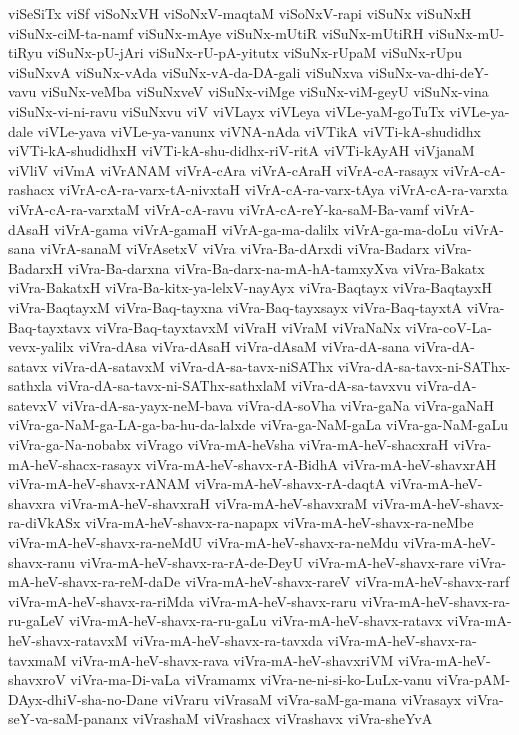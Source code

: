 {viSeSiTx
viSf
viSoNxVH
viSoNxV-maqtaM
viSoNxV-rapi
viSuNx
viSuNxH
viSuNx-ciM-ta-namf
viSuNx-mAye
viSuNx-mUtiR
viSuNx-mUtiRH
viSuNx-mU-tiRyu
viSuNx-pU-jAri
viSuNx-rU-pA-yitutx
viSuNx-rUpaM
viSuNx-rUpu
viSuNxvA
viSuNx-vAda
viSuNx-vA-da-DA-gali
viSuNxva
viSuNx-va-dhi-deY-vavu
viSuNx-veMba
viSuNxveV
viSuNx-viMge
viSuNx-viM-geyU
viSuNx-vina
viSuNx-vi-ni-ravu
viSuNxvu
viV
viVLayx
viVLeya
viVLe-yaM-goTuTx
viVLe-ya-dale
viVLe-yava
viVLe-ya-vanunx
viVNA-nAda
viVTikA
viVTi-kA-shudidhx
viVTi-kA-shudidhxH
viVTi-kA-shu-didhx-riV-ritA
viVTi-kAyAH
viVjanaM
viVliV
viVmA
viVrANAM
viVrA-cAra
viVrA-cAraH
viVrA-cA-rasayx
viVrA-cA-rashacx
viVrA-cA-ra-varx-tA-nivxtaH
viVrA-cA-ra-varx-tAya
viVrA-cA-ra-varxta
viVrA-cA-ra-varxtaM
viVrA-cA-ravu
viVrA-cA-reY-ka-saM-Ba-vamf
viVrA-dAsaH
viVrA-gama
viVrA-gamaH
viVrA-ga-ma-dalilx
viVrA-ga-ma-doLu
viVrA-sana
viVrA-sanaM
viVrAsetxV
viVra
viVra-Ba-dArxdi
viVra-Badarx
viVra-BadarxH
viVra-Ba-darxna
viVra-Ba-darx-na-mA-hA-tamxyXva
viVra-Bakatx
viVra-BakatxH
viVra-Ba-kitx-ya-lelxV-nayAyx
viVra-Baqtayx
viVra-BaqtayxH
viVra-BaqtayxM
viVra-Baq-tayxna
viVra-Baq-tayxsayx
viVra-Baq-tayxtA
viVra-Baq-tayxtavx
viVra-Baq-tayxtavxM
viVraH
viVraM
viVraNaNx
viVra-coV-La-vevx-yalilx
viVra-dAsa
viVra-dAsaH
viVra-dAsaM
viVra-dA-sana
viVra-dA-satavx
viVra-dA-satavxM
viVra-dA-sa-tavx-niSAThx
viVra-dA-sa-tavx-ni-SAThx-sathxla
viVra-dA-sa-tavx-ni-SAThx-sathxlaM
viVra-dA-sa-tavxvu
viVra-dA-satevxV
viVra-dA-sa-yayx-neM-bava
viVra-dA-soVha
viVra-gaNa
viVra-gaNaH
viVra-ga-NaM-ga-LA-ga-ba-hu-da-lalxde
viVra-ga-NaM-gaLa
viVra-ga-NaM-gaLu
viVra-ga-Na-nobabx
viVrago
viVra-mA-heVsha
viVra-mA-heV-shacxraH
viVra-mA-heV-shacx-rasayx
viVra-mA-heV-shavx-rA-BidhA
viVra-mA-heV-shavxrAH
viVra-mA-heV-shavx-rANAM
viVra-mA-heV-shavx-rA-daqtA
viVra-mA-heV-shavxra
viVra-mA-heV-shavxraH
viVra-mA-heV-shavxraM
viVra-mA-heV-shavx-ra-diVkASx
viVra-mA-heV-shavx-ra-napapx
viVra-mA-heV-shavx-ra-neMbe
viVra-mA-heV-shavx-ra-neMdU
viVra-mA-heV-shavx-ra-neMdu
viVra-mA-heV-shavx-ranu
viVra-mA-heV-shavx-ra-rA-de-DeyU
viVra-mA-heV-shavx-rare
viVra-mA-heV-shavx-ra-reM-daDe
viVra-mA-heV-shavx-rareV
viVra-mA-heV-shavx-rarf
viVra-mA-heV-shavx-ra-riMda
viVra-mA-heV-shavx-raru
viVra-mA-heV-shavx-ra-ru-gaLeV
viVra-mA-heV-shavx-ra-ru-gaLu
viVra-mA-heV-shavx-ratavx
viVra-mA-heV-shavx-ratavxM
viVra-mA-heV-shavx-ra-tavxda
viVra-mA-heV-shavx-ra-tavxmaM
viVra-mA-heV-shavx-rava
viVra-mA-heV-shavxriVM
viVra-mA-heV-shavxroV
viVra-ma-Di-vaLa
viVramamx
viVra-ne-ni-si-ko-LuLx-vanu
viVra-pAM-DAyx-dhiV-sha-no-Dane
viVraru
viVrasaM
viVra-saM-ga-mana
viVrasayx
viVra-seY-va-saM-pananx
viVrashaM
viVrashacx
viVrashavx
viVra-sheYvA
}
